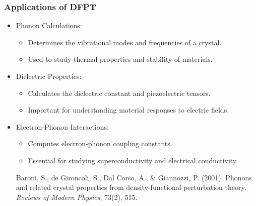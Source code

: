 \documentclass{CustomBeamer}
\begin{document}
    \begin{frame}
    \frametitle{Applications of DFPT}
    \begin{itemize}
        \item Phonon Calculations:
        \begin{itemize}
            \item Determines the vibrational modes and frequencies of a crystal.
            \item Used to study thermal properties and stability of materials.
        \end{itemize}
        \item Dielectric Properties:
        \begin{itemize}
            \item Calculates the dielectric constant and piezoelectric tensors.
            \item Important for understanding material responses to electric fields.
        \end{itemize}
        \item Electron-Phonon Interactions:
        \begin{itemize}
            \item Computes electron-phonon coupling constants.
            \item Essential for studying superconductivity and electrical conductivity.
        \end{itemize}

        Baroni, S., de Gironcoli, S., Dal Corso, A., \& Giannozzi, P. (2001). Phonons and related crystal properties from density-functional perturbation theory. \textit{Reviews of Modern Physics}, 73(2), 515.

    \end{itemize}
    \end{frame}
    
    
\end{document}

